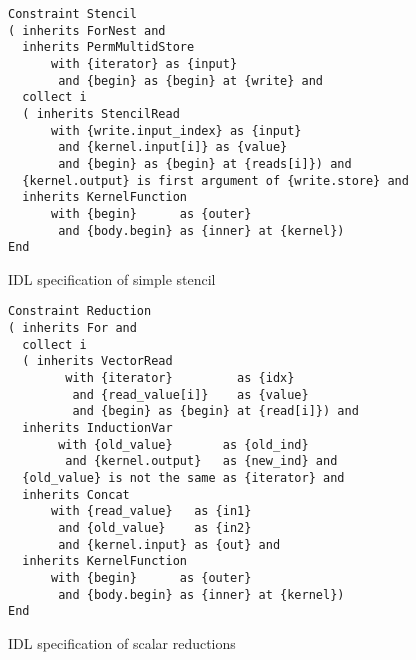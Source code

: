 \begin{figure}[p]
\begin{lstlisting}[language={constraints},numbers=none,xleftmargin=0cm,framexleftmargin=0em,basicstyle=\linespread{1.133}\scriptsize\ttfamily]
Constraint Stencil
( inherits ForNest and
  inherits PermMultidStore
      with {iterator} as {input} 
       and {begin} as {begin} at {write} and
  collect i
  ( inherits StencilRead
      with {write.input_index} as {input}
       and {kernel.input[i]} as {value}
       and {begin} as {begin} at {reads[i]}) and
  {kernel.output} is first argument of {write.store} and
  inherits KernelFunction
      with {begin}      as {outer}
       and {body.begin} as {inner} at {kernel})
End
\end{lstlisting}
\vspace{-.3cm}
\caption{IDL specification of simple stencil}
\label{fig:stencilcompute}
\vspace{.3cm}
\end{figure}

\begin{figure}[p]
\begin{lstlisting}[language={constraints},numbers=none,xleftmargin=0cm,framexleftmargin=0em,basicstyle=\linespread{1.133}\scriptsize\ttfamily]
Constraint Reduction
( inherits For and
  collect i
  ( inherits VectorRead
        with {iterator}         as {idx}
         and {read_value[i]}    as {value}
         and {begin} as {begin} at {read[i]}) and
  inherits InductionVar
       with {old_value}       as {old_ind}
        and {kernel.output}   as {new_ind} and
  {old_value} is not the same as {iterator} and
  inherits Concat
      with {read_value}   as {in1}
       and {old_value}    as {in2}
       and {kernel.input} as {out} and
  inherits KernelFunction
      with {begin}      as {outer}
       and {body.begin} as {inner} at {kernel})
End
\end{lstlisting}
\vspace{-.3cm}
\caption{IDL specification of scalar reductions}
\label{fig:scalarreduction}
\end{figure}